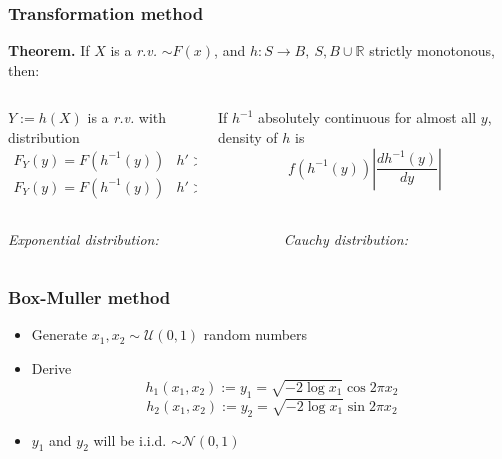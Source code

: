 \documentclass[10pt, serif, mathserif]{beamer}
\begin{document}
\begin{frame}
  \frametitle{Transformation method}
  \textbf{Theorem.} If $X$ is a \emph{r.v.} $\sim F(x)$, and $h : S \to B,\ S,B\cup \mathbb{R}$ strictly monotonous, then:
  \medskip
  \begin{columns}[t]
    \begin{column}{5cm}
      $Y := h(X)$ is a \emph{r.v.} with distribution
      \begin{align*} 
        F_Y(y) = F(h^{-1}(y)) & h' > 0 \\
        F_Y(y) = F(h^{-1}(y)) & h' > 0 
      \end{align*}
    \end{column}
    \begin{column}{5cm}
      If $h^{-1}$ absolutely continuous for almost all $y$, density of $h$ is
      \[
        f(h^{-1}(y)) \left| \frac{dh^{-1}(y)}{dy}\right|
      \]
    \end{column}
  \end{columns}

  \bigskip

  \bigskip
  
  \begin{columns}[t]
    \begin{column}{5cm}
      \centering \emph{Exponential distribution:}
    \end{column}

    \begin{column}{5cm}
      \centering \emph{Cauchy distribution:}
    \end{column}
  \end{columns}
\end{frame}

\begin{frame}
  \frametitle{Box-Muller method}
  \begin{itemize}
  	\item Generate $x_1, x_2 \sim \mathcal{U}(0,1)$ random numbers
  	\item Derive
  	  \[ h_1(x_1, x_2) := y_1 = \sqrt{-2 \log x_1} \cos{2\pi x_2} \]
  	  \[ h_2(x_1, x_2) := y_2 = \sqrt{-2 \log x_1} \sin{2\pi x_2} \] 
	\item $y_1$ and $y_2$ will be i.i.d. $\sim \mathcal{N}(0,1)$
  \end{itemize}
\end{frame}
\end{document}
